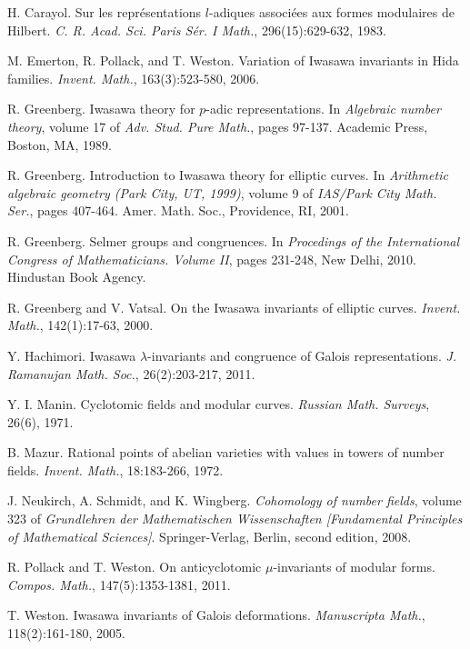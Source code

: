\documentclass[12 pt]{amsart}
\theoremstyle{plain}
\theoremstyle{definition}
\numberwithin{equation}{section}
\numberwithin{table}{section}
\begin{document}
\begin{thebibliography}{0}

 H. Carayol. Sur les repr\'{e}sentations $l$-adiques associ\'{e}es aux formes modulaires de Hilbert. {\it C. R. Acad. Sci. Paris S\'{e}r. I Math.}, 296(15):629-632, 1983.

 M. Emerton, R. Pollack, and T. Weston. Variation of Iwasawa invariants in Hida families. {\it Invent. Math.}, 163(3):523-580, 2006.

 R. Greenberg. Iwasawa theory for $p$-adic representations. In {\it Algebraic number theory}, volume 17 of {\it Adv. Stud. Pure Math.}, pages 97-137. Academic Press, Boston, MA, 1989.

 R. Greenberg. Introduction to Iwasawa theory for elliptic curves. In {\it Arithmetic algebraic geometry (Park City, UT, 1999)}, volume 9 of {\it IAS/Park City Math. Ser.}, pages 407-464. Amer. Math. Soc., Providence, RI, 2001.

 R. Greenberg. Selmer groups and congruences. In {\it Procedings of the International Congress of Mathematicians. Volume II}, pages 231-248, New Delhi, 2010. Hindustan Book Agency.

 R. Greenberg and V. Vatsal. On the Iwasawa invariants of elliptic curves. {\it Invent. Math.}, 142(1):17-63, 2000.

 Y. Hachimori. Iwasawa $\lambda$-invariants and congruence of Galois representations. {\it J. Ramanujan Math. Soc.}, 26(2):203-217, 2011.

 Y. I. Manin. Cyclotomic fields and modular curves. {\it Russian Math. Surveys}, 26(6), 1971.

 B. Mazur. Rational points of abelian varieties with values in towers of number fields. {\it Invent. Math.}, 18:183-266, 1972.

 J. Neukirch, A. Schmidt, and K. Wingberg. {\it Cohomology of number fields}, volume 323 of {\it Grundlehren der Mathematischen Wissenschaften [Fundamental Principles of Mathematical Sciences]}. Springer-Verlag, Berlin, second edition, 2008.

 R. Pollack and T. Weston. On anticyclotomic $\mu$-invariants of modular forms. {\it Compos. Math.}, 147(5):1353-1381, 2011.

 T. Weston. Iwasawa invariants of Galois deformations. {\it Manuscripta Math.}, 118(2):161-180, 2005.
\end{thebibliography}
\end{document}
